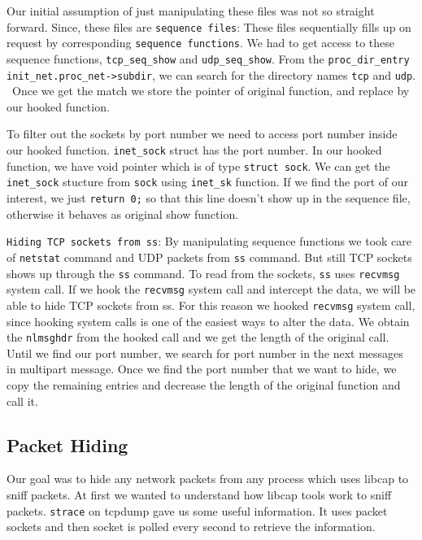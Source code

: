 \documentclass[10pt, letterpaper]{scrartcl}
\begin{document}
Our initial assumption of just manipulating these files was not so straight forward. 
Since, these files are \texttt{sequence files}: 
These files sequentially fills up on request by corresponding \texttt{sequence functions}. 
We had to get access to these sequence functions, \texttt{tcp\_seq\_show} and \texttt{udp\_seq\_show}. 
From the \texttt{proc\_dir\_entry} \texttt{init\_net.proc\_net->subdir}, 
we can search for the directory names \texttt{tcp} and \texttt{udp}. \
Once we get the match we store the pointer of original function, and replace by our hooked function. 

To filter out the sockets by port number we need to access port number inside our hooked function. 
\texttt{inet\_sock} struct has the port number. 
In our hooked function, we have void pointer which is of type \texttt{struct sock}. 
We can get the \texttt{inet\_sock} stucture from \texttt{sock} using \texttt{inet\_sk} function. 
If we find the port of our interest, we just \texttt{return 0;} so that this line doesn't show up in the 
sequence file, otherwise it behaves as original show function. 

\texttt{Hiding TCP sockets from ss}: By manipulating sequence functions we took care of \texttt{netstat} 
command and UDP packets from \texttt{ss} command. But still TCP sockets shows up through the \texttt{ss} command.
To read from the sockets, \texttt{ss} uses \texttt{recvmsg} system call. 
If we hook the \texttt{recvmsg} system call and intercept the data, we will be able to hide TCP sockets from ss. 
For this reason we hooked \texttt{recvmsg} system call, 
since hooking system calls is one of the easiest ways to alter the data.
We obtain the \texttt{nlmsghdr} from the hooked call and we get the length of the original call.
Until we find our port number, we search for port number in the next messages in multipart message. 
Once we find the port number that we want to hide, 
we copy the remaining entries and decrease the length of the original function and call it.


\subsection{Packet Hiding}
Our goal was to hide any network packets from any process which uses libcap to  sniff packets.
At first we wanted to understand how libcap tools work to sniff packets. \texttt{strace} on tcpdump gave us some useful information. It uses packet sockets and then socket is polled every second to retrieve the information.   
\end{document}

